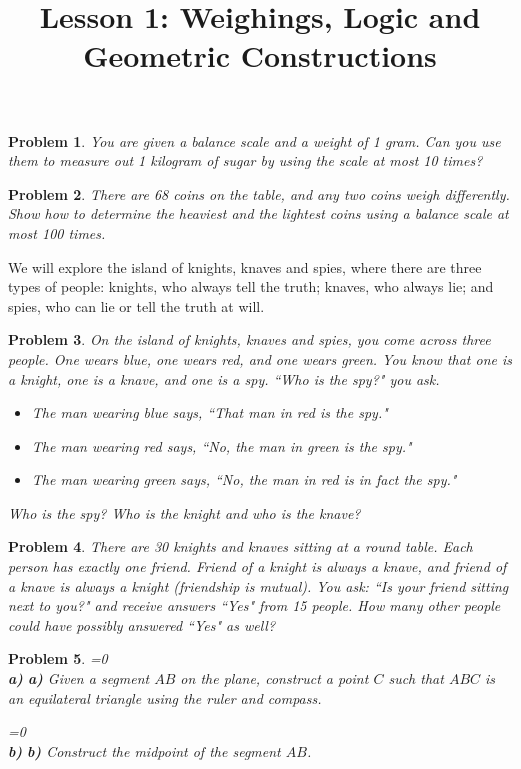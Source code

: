 \documentclass[a4paper,12pt]{article}
\title{Lesson 1: Weighings, Logic and Geometric Constructions}
\theoremstyle{perfect}
\newtheorem{prb}{Problem}
\newcommand{\varline}{0}
\renewcommand\part[1]{
\ifnum\pdfstrcmp{\varline}{1}=0
    \vspace{.10in}\textbf{\\#1)}
  \else
    \textbf{#1)}
  \fi\renewcommand{\varline}{1}}
\begin{document}
 
\maketitle

\begin{prb}
You are given a balance scale and a weight of 1 gram. Can you use them to measure out 1 kilogram of sugar by using the scale at most 10 times?
\end{prb}

\begin{prb}
There are 68 coins on the table, and any two coins weigh differently. Show how to determine the heaviest and the lightest coins using a balance scale at most 100 times. 
\end{prb}


We will explore the island of knights, knaves and spies, where there are three types of people: knights, who always tell the truth; knaves, who always lie; and spies, who can lie or tell the truth at will.

\begin{prb}
On the island of knights, knaves and spies, you come across three people. One wears blue, one wears red, and one wears green. You know that one is a knight, one is a knave, and one is a spy. 
``Who is the spy?" you ask.

\begin{itemize}
\item The man wearing blue says, ``That man in red is the spy."
\item The man wearing red says, ``No, the man in green is the spy."
\item The man wearing green says, ``No, the man in red is in fact the spy."
\end{itemize}
\noindent
Who is the spy? Who is the knight and who is the knave?
\end{prb}

\begin{prb}
There are 30 knights and knaves sitting at a round table. Each person has exactly one friend. Friend of a knight is always a knave, and friend of a knave is always a knight (friendship is mutual). You ask: ``Is your friend sitting next to you?" and receive answers ``Yes" from 15 people. How many other people could have possibly answered ``Yes" as well?
\end{prb}


\begin{prb}
\part{a} Given a segment $AB$ on the plane, construct a point $C$ such that $ABC$ is an equilateral triangle using the ruler and compass.
\part{b} Construct the midpoint of the segment $AB$. 
\end{prb}
\end{document}
